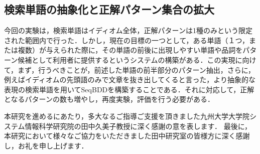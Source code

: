 \documentclass[12pt,twoside, fleqn]{ujbook}
\begin{document}
\subsection{検索単語の抽象化と正解パターン集合の拡大}
今回の実験は，検索単語はイディオム全体，正解パターンは1種のみという限定された範囲内で行った．しかし，現在の目標の一つとして，ある単語（１つ，または複数）が与えられた際に，その単語の前後に出現しやすい単語や品詞をパターン候補として利用者に提供するというシステムの構築がある．この実現に向けて，まず，行うべきことが，前述した単語の前半部分のパターン抽出，さらに，例えばイディオムの先頭語のみで文章を抜き出してくると言った，より抽象的な表現の検索単語を用いてSeqBDDを構築することである．それに対応して，正解となるパターンの数も増やし，再度実験，評価を行う必要がある．

\newpage
\acknowledgment
本研究を進めるにあたり，多大なるご指導ご支援を頂きました九州大学大学院システム情報科学研究院の田中久美子教授に深く感謝の意を表します．
最後に，本研究において様々なご協力をいただきました田中研究室の皆様方に深く感謝し，お礼を申し上げます．




\appendix
\end{document}
